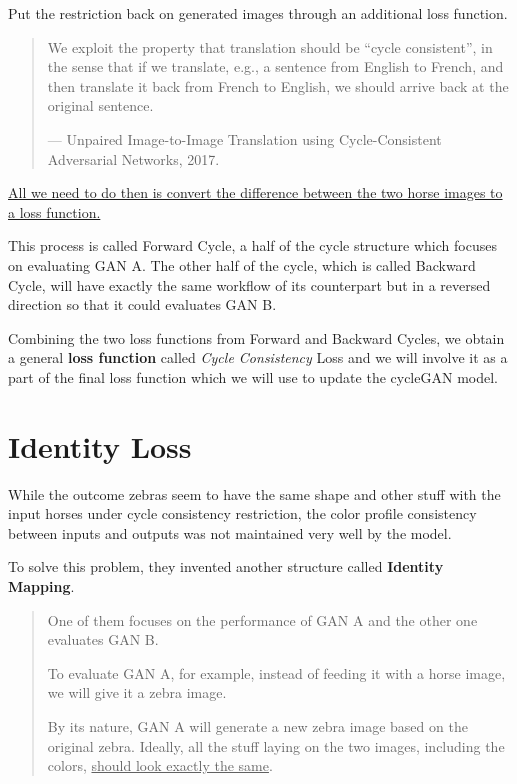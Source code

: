 \documentclass[
]{article}
\begin{document}
Put the restriction back on generated images through an additional loss
function.

\begin{quote}
We exploit the property that translation should be ``cycle consistent'',
in the sense that if we translate, e.g., a sentence from English to
French, and then translate it back from French to English, we should
arrive back at the original sentence.

--- Unpaired Image-to-Image Translation using Cycle-Consistent
Adversarial Networks, 2017.
\end{quote}

\uline{All we need to do then is convert the difference between the two
horse images to a loss function.}

This process is called Forward Cycle, a half of the cycle structure
which focuses on evaluating GAN A. The other half of the cycle, which is
called Backward Cycle, will have exactly the same workflow of its
counterpart but in a reversed direction so that it could evaluates GAN
B.

Combining the two loss functions from Forward and Backward Cycles, we
obtain a general \textbf{loss function} called \emph{Cycle Consistency}
Loss and we will involve it as a part of the final loss function which
we will use to update the cycleGAN model.

\hypertarget{identity-loss}{%
\section{Identity Loss}\label{identity-loss}}

While the outcome zebras seem to have the same shape and other stuff
with the input horses under cycle consistency restriction, the color
profile consistency between inputs and outputs was not maintained very
well by the model.

To solve this problem, they invented another structure called
\textbf{Identity Mapping}.

\begin{quote}
One of them focuses on the performance of GAN A and the other one
evaluates GAN B.

To evaluate GAN A, for example, instead of feeding it with a horse
image, we will give it a zebra image.

By its nature, GAN A will generate a new zebra image based on the
original zebra. Ideally, all the stuff laying on the two images,
including the colors, \uline{should look exactly the same}.
\end{quote}
\end{document}
